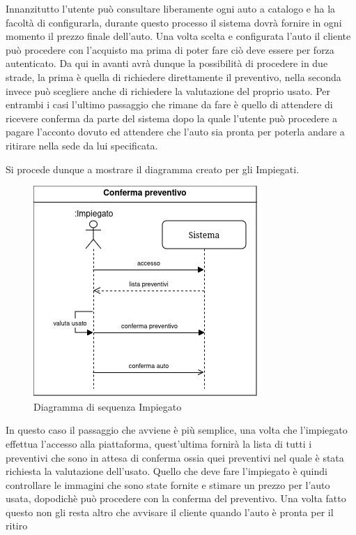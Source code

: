 \documentclass[a4paper, 11pt,oneside]{book}
\newcommand{\spacing}{\par\bigskip\noindent}
\begin{document}
        Innanzitutto l'utente può consultare liberamente ogni auto a catalogo e ha la facoltà di configurarla, durante questo processo il sistema dovrà fornire in ogni momento
        il prezzo finale dell'auto. Una volta scelta e configurata l'auto il cliente può procedere con l'acquisto ma prima di poter fare ciò deve essere per forza autenticato.
        Da qui in avanti avrà dunque la possibilità di procedere in due strade, la prima è quella di richiedere direttamente il preventivo, nella seconda invece può scegliere anche di richiedere 
        la valutazione del proprio usato. Per entrambi i casi l'ultimo passaggio che rimane da fare è quello di attendere di ricevere conferma da parte del sistema dopo la quale l'utente può procedere a pagare
        l'acconto dovuto ed attendere che l'auto sia pronta per poterla andare a ritirare nella sede da lui specificata.
        \spacing
        Si procede dunque a mostrare il diagramma creato per gli Impiegati.
        \begin{figure}[H]
            \centering
            \includegraphics[scale=0.75]{sequence_diagram_confirm.png}
            \caption{Diagramma di sequenza Impiegato}
            \label{fig:diagramma_sequenza_impiegato}
        \end{figure}
        \spacing
        In questo caso il passaggio che avviene è più semplice, una volta che l'impiegato effettua l'accesso alla piattaforma, quest'ultima fornirà la lista di tutti
        i preventivi che sono in attesa di conferma ossia quei preventivi nel quale è stata richiesta la valutazione dell'usato. Quello che deve fare l'impiegato è quindi controllare le immagini che sono state fornite
        e stimare un prezzo per l'auto usata, dopodichè può procedere con la conferma del preventivo. Una volta fatto questo non gli resta altro che avvisare il cliente quando l'auto è pronta per il ritiro
\end{document}
